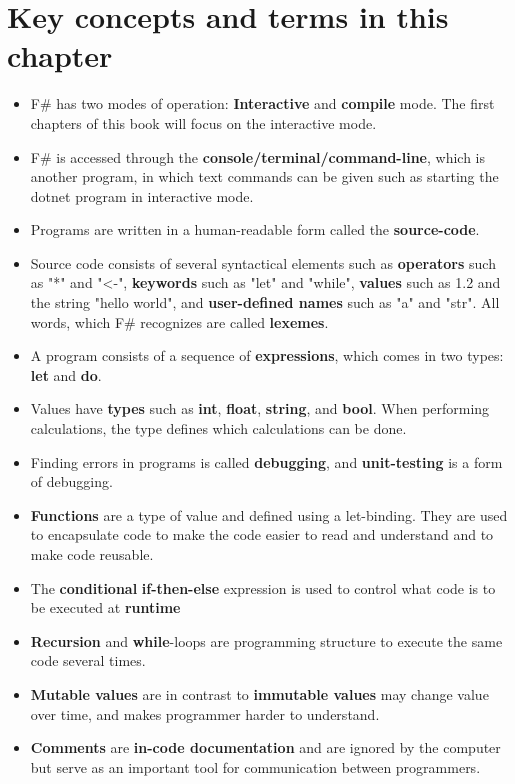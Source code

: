 \documentclass[springer.tex]{subfiles}
\begin{document}
\section{Key concepts and terms in this chapter}
\begin{itemize}
\item F\# has two modes of operation: \textbf{Interactive} and \textbf{compile} mode. The first chapters of this book will focus on the interactive mode. 
\item F\# is accessed through the \textbf{console/terminal/command-line}, which is another program, in which text commands can be given such as starting the dotnet program in interactive mode.
\item Programs are written in a human-readable form called the \textbf{source-code}.
\item Source code consists of several syntactical elements such as \textbf{operators} such as "*" and "<-", \textbf{keywords} such as "let" and "while", \textbf{values} such as 1.2 and the string "hello world", and \textbf{user-defined names} such as "a" and "str". All words, which F\# recognizes are called \textbf{lexemes}.
\item A program consists of a sequence of \textbf{expressions}, which comes in two types: \textbf{let} and \textbf{do}.
\item Values have \textbf{types} such as \textbf{int}, \textbf{float}, \textbf{string}, and \textbf{bool}. When performing calculations, the type defines which calculations can be done.
\item Finding errors in programs is called \textbf{debugging}, and \textbf{unit-testing} is a form of debugging. 
\item \textbf{Functions} are a type of value and defined using a let-binding. They are used to encapsulate code to make the code easier to read and understand and to make code reusable.
\item The \textbf{conditional} \textbf{if-then-else} expression is used to control what code is to be executed at \textbf{runtime}
\item \textbf{Recursion} and \textbf{while}-loops are programming structure to execute the same code several times.
\item \textbf{Mutable values} are in contrast to \textbf{immutable values} may change value over time, and makes programmer harder to understand.
\item \textbf{Comments} are \textbf{in-code documentation} and are ignored by the computer but serve as an important tool for communication between programmers.
\end{itemize}
\end{document}
